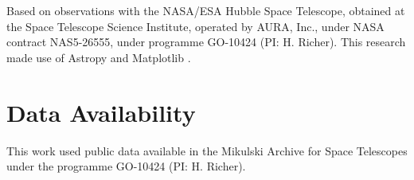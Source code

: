 \documentclass[fleqn,usenatbib,useAMS,letters]{mnras}
\begin{document}
Based on observations with the NASA/ESA Hubble Space Telescope, obtained at the Space Telescope Science Institute, operated by AURA, Inc., under NASA contract NAS5-26555, under programme GO-10424 (PI: H. Richer). This research made use of Astropy \citep{astropy:2013, astropy:2018} and Matplotlib \citep{matplotlib}.



\section{Data Availability}

This work used public data available in the Mikulski Archive for Space Telescopes under the programme GO-10424 (PI: H. Richer).










\bsp	%
\label{lastpage}
\end{document}
